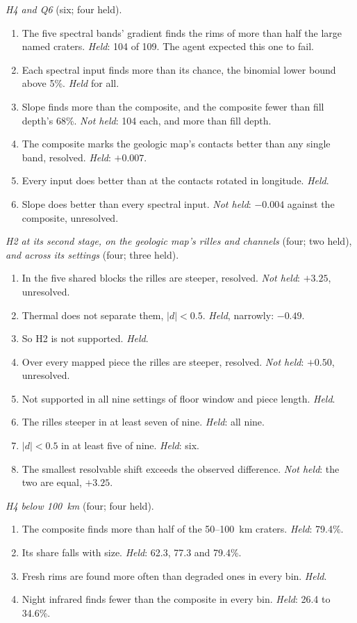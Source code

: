 \documentclass[twocolumn]{aastex701}
\begin{document}
\emph{H4 and Q6} (six; four held).
\begin{enumerate}
\item[H4-1] The five spectral bands' gradient finds the rims of more than half the large named craters. \emph{Held}: 104
of 109. The agent expected this one to fail.
\item[H4-2] Each spectral input finds more than its chance, the binomial lower bound above 5\%. \emph{Held} for all.
\item[H4-3] Slope finds more than the composite, and the composite fewer than fill depth's 68\%. \emph{Not held}: 104
each, and more than fill depth.
\item[Q6-1] The composite marks the geologic map's contacts better than any single band, resolved. \emph{Held}: $+0.007$.
\item[Q6-2] Every input does better than at the contacts rotated in longitude. \emph{Held}.
\item[Q6-3] Slope does better than every spectral input. \emph{Not held}: $-0.004$ against the composite, unresolved.
\end{enumerate}

\emph{H2 at its second stage, on the geologic map's rilles and channels} (four; two held), \emph{and across its
settings} (four; three held).
\begin{enumerate}
\item[P1] In the five shared blocks the rilles are steeper, resolved. \emph{Not held}: $+3.25$, unresolved.
\item[P2] Thermal does not separate them, $|d|<0.5$. \emph{Held}, narrowly: $-0.49$.
\item[P3] So H2 is not supported. \emph{Held}.
\item[P4] Over every mapped piece the rilles are steeper, resolved. \emph{Not held}: $+0.50$, unresolved.
\item[S1] Not supported in all nine settings of floor window and piece length. \emph{Held}.
\item[S2] The rilles steeper in at least seven of nine. \emph{Held}: all nine.
\item[S3] $|d|<0.5$ in at least five of nine. \emph{Held}: six.
\item[S4] The smallest resolvable shift exceeds the observed difference. \emph{Not held}: the two are equal, $+3.25$.
\end{enumerate}

\emph{H4 below 100~km} (four; four held).
\begin{enumerate}
\item[K1] The composite finds more than half of the 50--100~km craters. \emph{Held}: 79.4\%.
\item[K2] Its share falls with size. \emph{Held}: 62.3, 77.3 and 79.4\%.
\item[K3] Fresh rims are found more often than degraded ones in every bin. \emph{Held}.
\item[K4] Night infrared finds fewer than the composite in every bin. \emph{Held}: 26.4 to 34.6\%.
\end{enumerate}
\end{document}
